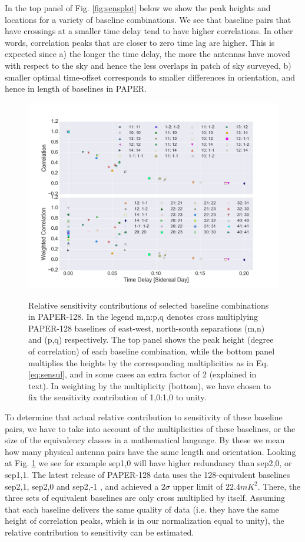 \documentclass[preprint2,numberedappendix,tighten,twocolappendix]{aastex6}  %
\renewcommand\[{\begin{equation}}
\renewcommand\]{\end{equation}}
\begin{document}
In the top panel of Fig. \eqref{fig:sensplot} below
we show the peak heights and locations for a variety of baseline combinations.
We see that baseline pairs that have crossings at a smaller time delay
tend to have higher correlations. In other words, correlation peaks
that are closer to zero time lag are higher. This is expected since
a) the longer the time delay, the more the antennas have moved with respect
to the sky and hence the less overlaps in patch of sky surveyed, b) smaller optimal
time-offset corresponds to smaller differences in orientation, and hence in length of
baselines in PAPER. 

\begin{figure}[H]
\includegraphics[width=\linewidth]{sensitivity}
\label{fig:sensplot}
\caption{Relative sensitivity contributions of selected baseline combinations in PAPER-128. In the legend m,n:p,q denotes cross
multiplying PAPER-128 baselines of east-west, north-south separations (m,n) and (p,q) respectively. The top
panel shows the peak height (degree of correlation) of each baseline
combination, while the bottom panel multiplies the heights by the
corresponding multiplicities as in Eq. \eqref{eq:sensul}, and in some cases an extra factor of 2 (explained in text). 
In weighting by the multiplicity (bottom), we have chosen to fix the sensitivity 
contribution of 1,0:1,0 to unity. }


\end{figure}


To determine that actual relative contribution to sensitivity of these
baseline pairs, we have to take into account of the multiplicities of
these baselines, or the size of the equivalency classes in a mathematical
language. By these we mean how many physical antenna pairs have the
same length and orientation. Looking at Fig. \ref{fig:sensplot}
we see for example sep1,0 will have higher redundancy than sep2,0,
or sep1,1. The latest release of PAPER-128 data uses the 128-equivalent baselines sep2,1,
sep2,0 and sep2,-1 \cite{Ali2015}, and achieved a $2\sigma$ upper
limit of $22.4mK^{2}$. There, the three sets of equivalent baselines
are only cross multiplied by itself. Assuming that each baseline delivers
the same quality of data (i.e. they have the same height of correlation
peaks, which is in our normalization equal to unity), the relative
contribution to sensitivity can be estimated. 
\end{document}
